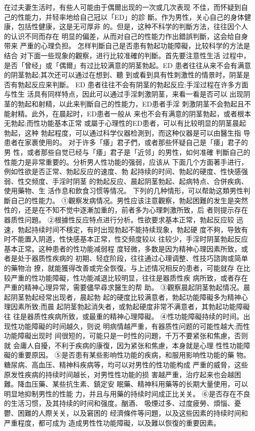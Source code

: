 \documentclass[12pt,UTF8]{ctexbook}
\begin{document}
在过夫妻生活时，有些人可能由于偶爾出现的一次或几次表现
不佳，而怀疑到自己的性能力，并轻率地给自己冠以「ED」的診
斷。作为男性，关心自己的身体健康，包括性健康，这是无可厚非
的。但是，这种不科学的判斷方法，往往因个人的认识不同而存在
明显的偏差，从而对自己的性能力作出錯誤判斷，这会给自身带来
严重的心理负担。
怎样判斷自己是否患有勃起功能障礙，比较科学的方法是结合
对下面一些现象的觀察，进行比较准確的判斷。首先要注意性生活
过程中，是否「曾经」或「偶爾」有过比较满意的阴茎勃起。ED
患者往往从来不会有满意的阴茎勃起;其次还可以通过在想到、聽
到或看到具有性刺激性的情景时，阴茎是否有勃起反应来判斷。
ED 患者往往不会有阴茎的勃起反应;手淫过程在许多方面与性生
活具有同样特点，因此可以通过手淫刺激阴茎，来看一看是否可以
出现阴茎的勃起和射精，以此来判斷自己的性能力，ED患者手淫
刺激阴茎不会勃起且不能射精。此外，在晨起时，ED患者一般从
来也不会有满意的阴茎勃起，或者根本无勃起;而性功能基本正常
或屬于心理性的ED患者，可以有比较明显的阴茎晨起勃起，这种
勃起程度，可以通过科学仪器检測到，而这种仪器是可以由醫生指
导患者在家裹使用的。
对于许多「痿」君子們，或者那些怀疑自己是「痿」君子的男
性，或者那些自觉已经与「痿」君子是「近邻」的男性，如何准確
判斷自己的性能力是非常重要的。分析男人性功能的强弱，应该从
下面几个方面著手进行，例如性欲是否正常、勃起反应的速度、勃
起持续的时间、勃起的硬度、性快感强弱、性交频度、手淫时阴茎
的勃起反应、晨起阴茎勃起、起病特点、合併疾病、使用藥物、生
活作息和飲食习惯等情况。
下列的几种情形，可以帮助这類男性判斷自己的性能力。
①觀察发病情况。男性应该注意觀察，勃起困難的发生是突然
性的，还是在不知不觉中逐漸加重的，前者多为心理刺激所致，后
者则提示存在器质性问題。
②根據性反应特点进行分析。性欲要求基本正常，勃起反应较
迅速，勃起持续时间不穩定，有时出现勃起不能持续现象，勃起硬
度不夠，导致有时不能置入阴道，性快感基本正常，性交频度较以
往较少，手淫时阴茎勃起反应基本正常。这种患者的性功能减弱程
度轻微，多数是因为精神心理因素所致，或者是处于器质性疾病的
初期、轻症阶段，往往通过心理调整、性技巧諮詢或简单的藥物治
撩，就能獲得改善或完全恢復。与上述情况相反的患者，可能就存
在比较严重的性功能障礙，性功能减退比较明显，往往是器质性疾
病所致，或者存在严重的精神心理异常，需要儘早尋求醫生的帮
助。
③觀察晨起阴茎勃起情况。晨起阴茎勃起经常出现者，晨起勃
起的硬度比较满意者，勃起功能障礙多为精神心理因素所致;而晨
起阴茎勃起消失者，或勃起硬度非常不满意者，其勃起功能障礙往
往是器质性疾病所致，或最重的精神心理障礙。
④性功能障礙持续的时间。出现性功能障礙的时间越久，则说
明病情越严重，有器质性问题的可能性越大;而性功能障礙出现时
间很短的，可能只是一时性的问題，千万不要紧张和焦慮，否则就
会庸人自擾，不利于疾病的康復，因为紧张和焦慮，本身就是心理
性性功能障礙的重要原因。
⑤是否患有某些影响性功能的疾病，和服用影响性功能的藥
物。糖尿病、高血压、精神科疾病等，均可以对男性的性功能构成
严重的威脅，这些原发性疾病的持续时间越长，对男性性功能的损
害越严重，治疗起来也会越困難。降血压藥、某些抗生素、鎮定安
眠藥、精神科用藥等的长期大量使用，可以明显地抑制男性的性能
力，并且与用藥的持续时间成正比关关。
⑥是否存在不良的生活习惯，及其持续的时间和强度。酗酒、
吸煙过多、过度疲勞、煩惱、憂鬱、困難的人際关关，以及窘困的
经濟條件等问題，以及这些因素的持续时间和严重程度，都可成为
造成男性性功能障礙，以及難以恢復的重要因素。
\end{document}
